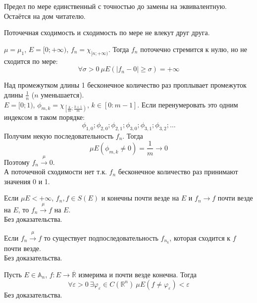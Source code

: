 \documentclass{article}
\let\eps\varepsilon
\begin{document}
    \begin{property}
        Предел по мере единственный с точностью до замены на эквивалентную.\\
        Остаётся на дом читателю.
    \end{property}
    \begin{claim}
        Поточечная сходимость и сходимость по мере не влекут друг друга.
    \end{claim}
    \begin{example}
        $\mu=\mu_1$, $E=[0;+\infty)$, $f_n=\chi_{[n;+\infty)}$. Тогда $f_n$ поточечно стремится к нулю, но не сходится по мере:
        $$
        \forall\sigma>0~\mu E(|f_n-0|\geqslant\sigma)=+\infty
        $$
    \end{example}
    \begin{example}
        Над промежутком длины 1 бесконечное количество раз проплывает промежуток длины $\frac1n$ ($n$ уменьшается).\\
        $E=[0;1)$, $\phi_{m,k}=\chi_{\left[\frac km;\frac{k+1}m\right)}$, $k\in[0:m-1]$. Если перенумеровать это одним индексом в таком порядке:
        $$
        \phi_{1,0};\phi_{2,0};\phi_{2,1};\phi_{3,0};\phi_{3,1};\phi_{3,2};\ldots
        $$
        Получим некую последовательность $f_n$. Тогда
        $$
        \mu E(\phi_{m,k}\neq0)=\frac1m\rightarrow0
        $$
        Поэтому $f_n\overset\mu\rightarrow 0$.\\
        А поточечной сходимости нет т.к. $f_n$ бесконечное количество раз принимают значения 0 и 1.
    \end{example}
    \begin{theorem}
        Если $\mu E<+\infty$, $f_n,f\in S(E)$ и конечны почти везде на $E$ и $f_n\to f$ почти везде на $E$, то $f_n\overset\mu\to f$ на $E$.\\
        Без доказательства.
    \end{theorem}
    \begin{theorem}
        \label{Теорема Рисса}
        Если $f_n\overset\mu\to f$ то существует подпоследовательность $f_{n_k}$, которая сходится к $f$ почти везде.\\
        Без доказательства.
    \end{theorem}
    \begin{theorem}
        \label{C-свойство Лузина}
        Пусть $E\in\mathbb A_n$, $f\colon E\to\overline{\mathbb R}$ измерима и почти везде конечна. Тогда
        $$
        \forall\eps>0~\exists\varphi_\eps\in C(\mathbb R^n)~\mu E(f\neq\varphi_\eps)<\eps
        $$
        Без доказательства.
    \end{theorem}
\end{document}
